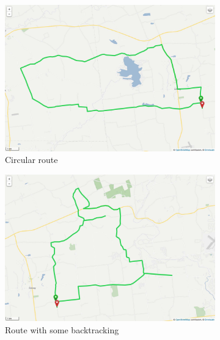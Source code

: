 \documentclass[honors]{union-cs-thesis}
\begin{document}
\begin{figure}
\begin{subfigure}{.48\linewidth}
\centering
\includegraphics[width=\textwidth]{figs/ls-route1}
\caption{Circular route}
\label{fig:ls-route1}
\end{subfigure}%
\hfill
\begin{subfigure}{.48\linewidth}
\centering
\includegraphics[width=\textwidth]{figs/ls-route2}
\caption{Route with some backtracking}
\label{fig:ls-route2}
\end{subfigure}\\[1ex]
\begin{center}
\begin{subfigure}{0.48\linewidth}

\end{subfigure}
\end{center}
\end{figure}
\end{document}
